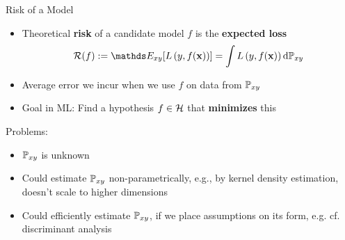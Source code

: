 \documentclass[11pt,compress,t,notes=noshow, xcolor=table]{beamer}
\begin{document}
\begin{vbframe}{Risk of a Model}
  
  \begin{itemize}
    \item Theoretical \textbf{risk} of a candidate model $f$ is the \textbf{expected loss}
    $$ \riskf := \E_{xy} [\Lxy] = \int \Lxy \text{d}\Pxy $$
    \item Average error we incur when we use $f$ on data from $\mathbb{P}_{xy}$
    \item Goal in ML: Find a hypothesis $f \in \mathcal{H}$ that \textbf{minimizes} this
  \end{itemize}
  
  \vfill
  
  Problems: 
  
  \begin{itemize}
    \item $\mathbb{P}_{xy}$ is unknown
    \item Could estimate $\mathbb{P}_{xy}$ non-parametrically, e.g., by kernel density estimation,  doesn't scale to higher dimensions
    \item Could efficiently estimate $\mathbb{P}_{xy}$, if we place assumptions on its form, e.g. cf. discriminant analysis
  \end{itemize}
  
  \lz
  
  
\end{vbframe}

\end{document}
